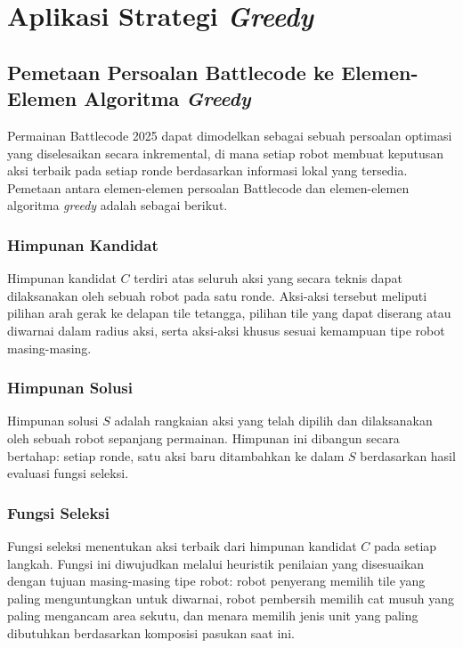 \section{Aplikasi Strategi \textit{Greedy}}
\label{sec:bab3}

\subsection{Pemetaan Persoalan Battlecode ke Elemen-Elemen Algoritma
            \textit{Greedy}}

Permainan Battlecode 2025 dapat dimodelkan sebagai sebuah persoalan
optimasi yang diselesaikan secara inkremental, di mana setiap robot
membuat keputusan aksi terbaik pada setiap ronde berdasarkan informasi
lokal yang tersedia.  Pemetaan antara elemen-elemen persoalan Battlecode
dan elemen-elemen algoritma \textit{greedy} adalah
sebagai berikut.

\subsubsection{Himpunan Kandidat}

Himpunan kandidat $C$ terdiri atas seluruh aksi yang secara teknis dapat
dilaksanakan oleh sebuah robot pada satu ronde.  Aksi-aksi tersebut
meliputi pilihan arah gerak ke delapan tile tetangga, pilihan tile yang
dapat diserang atau diwarnai dalam radius aksi, serta aksi-aksi khusus
sesuai kemampuan tipe robot masing-masing.

\subsubsection{Himpunan Solusi}

Himpunan solusi $S$ adalah rangkaian aksi yang telah dipilih dan
dilaksanakan oleh sebuah robot sepanjang permainan.  Himpunan ini
dibangun secara bertahap: setiap ronde, satu aksi baru ditambahkan ke
dalam $S$ berdasarkan hasil evaluasi fungsi seleksi.

\subsubsection{Fungsi Seleksi}

Fungsi seleksi menentukan aksi terbaik dari himpunan kandidat $C$ pada
setiap langkah.  Fungsi ini diwujudkan melalui heuristik penilaian yang
disesuaikan dengan tujuan masing-masing tipe robot: robot penyerang
memilih tile yang paling menguntungkan untuk diwarnai, robot pembersih
memilih cat musuh yang paling mengancam area sekutu, dan menara memilih
jenis unit yang paling dibutuhkan berdasarkan komposisi pasukan saat ini.

